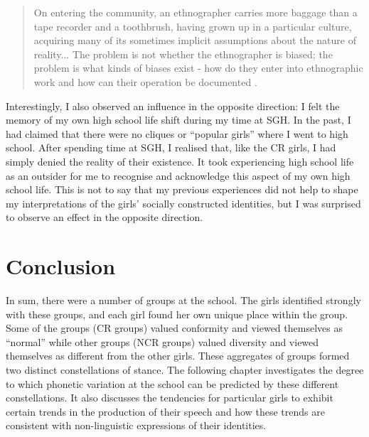 \begin{quote}
	On entering the community, an ethnographer carries more baggage than a tape recorder and a toothbrush, having grown up in a particular culture, acquiring many of its sometimes implicit assumptions about the nature of reality... The problem is not whether the ethnographer is biased; the problem is what kinds of biases exist - how do they enter into ethnographic work and how can their operation be documented \cite[41-2]{agar1980}.
\end{quote}

\noindent Interestingly, I also observed an influence in the opposite direction: I felt the memory of my own high school life shift during my time at SGH.  In the past, I had claimed that there were no cliques or ``popular girls'' where I went to high school.  After spending time at SGH, I realised that, like the CR girls, I had simply denied the reality of their existence.  It took experiencing high school life as an outsider for me to recognise and acknowledge this aspect of my own high school life.  This is not to say that my previous experiences did not help to shape my interpretations of the girls' socially constructed identities, but I was surprised to observe an effect in the opposite direction.

\section{Conclusion}

In sum, there were a number of groups at the school.  The girls identified strongly with these groups, and each girl found her own unique place within the group.  Some of the groups (CR groups) valued conformity and viewed themselves as ``normal'' while other groups (NCR groups) valued diversity and viewed themselves as different from the other girls.  These aggregates of groups formed two distinct constellations of stance.  The following chapter investigates the degree to which phonetic variation at the school can be predicted by these different constellations.  It also discusses the tendencies for particular girls to exhibit certain trends in the production of their speech and how these trends are consistent with non-linguistic expressions of their identities.


\newpage
\thispagestyle{empty}
\mbox{}